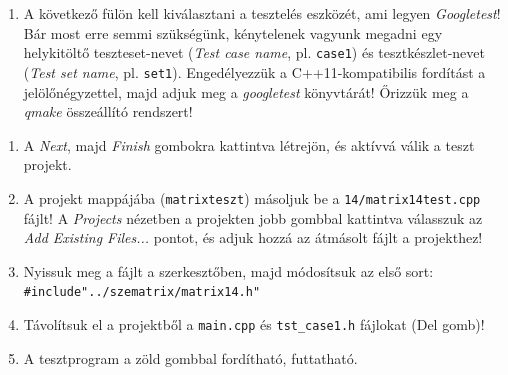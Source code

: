 \begin{frame}
  \begin{enumerate}
    \setcounter{enumi}{\theqt}
    \item A következő fülön kell kiválasztani a tesztelés eszközét, ami legyen \emph{Googletest}! Bár most erre semmi 
szükségünk, kénytelenek vagyunk megadni egy helykitöltő teszteset-nevet (\emph{Test case name}, pl. \texttt{case1}) és 
tesztkészlet-nevet (\emph{Test set name}, pl. \texttt{set1}). Engedélyezzük a C++11-kompatibilis fordítást a jelölőnégyzettel, 
majd adjuk meg a \emph{googletest} könyvtárát! Őrizzük meg a \emph{qmake} összeállító rendszert!\\
    \setcounter{qt}{\theenumi}
  \end{enumerate}
\end{frame}

\begin{frame}
  \begin{enumerate}
    \setcounter{enumi}{\theqt}
    \item A \emph{Next}, majd \emph{Finish} gombokra kattintva létrejön, és aktívvá válik a teszt projekt.
    \item A projekt mappájába (\texttt{matrixteszt}) másoljuk be a \texttt{14/matrix14test.cpp} fájlt! A \emph{Projects} nézetben a projekten jobb gombbal kattintva válasszuk az \emph{Add Existing Files...} pontot, és adjuk hozzá az átmásolt fájlt a projekthez!
    \item Nyissuk meg a fájlt a szerkesztőben, majd módosítsuk az első sort: \texttt{\#include"../szematrix/matrix14.h"}
    \item Távolítsuk el a projektből a \texttt{main.cpp} és \texttt{tst\_case1.h} fájlokat (Del gomb)!
    \item A tesztprogram a zöld gombbal fordítható, futtatható.
    \setcounter{qt}{\theenumi}
  \end{enumerate}
\end{frame}

